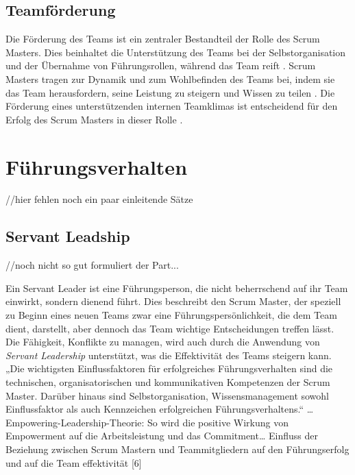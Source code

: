 \documentclass[5pt, final]{beamer}
\begin{document}
\begin{frame}[t]
\begin{multicols}{3}
			\subsection{Teamförderung}
			
			Die Förderung des Teams ist ein zentraler Bestandteil der Rolle des Scrum Masters.
            Dies beinhaltet die Unterstützung des Teams bei der Selbstorganisation und der Übernahme von Führungsrollen, während das Team reift \cite{?}.
            Scrum Masters tragen zur Dynamik und zum Wohlbefinden des Teams bei, indem sie das Team herausfordern, seine Leistung zu steigern und Wissen zu teilen \cite{?}.
            Die Förderung eines unterstützenden internen Teamklimas ist entscheidend für den Erfolg des Scrum Masters in dieser Rolle \cite{?}.
			
			\section {Führungsverhalten}
            
            //hier fehlen noch ein paar einleitende Sätze
            
            \subsection{Servant Leadship}
			
			//noch nicht so gut formuliert der Part...
			
			Ein Servant Leader ist eine Führungsperson, die nicht beherrschend auf ihr Team einwirkt, sondern dienend führt.
            Dies beschreibt den Scrum Master, der speziell zu Beginn eines neuen Teams zwar eine Führungspersönlichkeit, die dem Team dient, darstellt, aber dennoch das Team wichtige Entscheidungen treffen lässt.
            Die Fähigkeit, Konflikte zu managen, wird auch durch die Anwendung von \textit{Servant Leadership} unterstützt, was die Effektivität des Teams steigern kann.
			„Die wichtigsten Einflussfaktoren für erfolgreiches Führungsverhalten sind die technischen, organisatorischen und kommunikativen Kompetenzen der Scrum Master. Darüber hinaus sind Selbstorganisation, Wissensmanagement sowohl Einflussfaktor als auch Kennzeichen erfolgreichen Führungsverhaltens.“ …
            Empowering-Leadership-Theorie: So wird die positive Wirkung von Empowerment auf die Arbeitsleistung und das Commitment… Einfluss der Beziehung zwischen Scrum Mastern und Teammitgliedern auf den Führungserfolg und auf die Team effektivität [6]
			

\end{multicols}
\end{frame}
\end{document}
